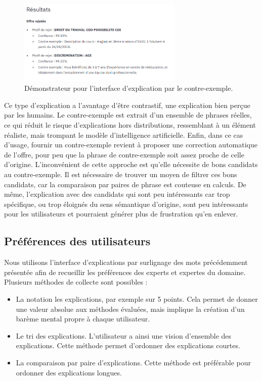 \begin{figure}[htpb!]
\centering
\includegraphics[width=0.7\textwidth]{S2-Explicabilite_locale/figures/demo_cfe.png}
\caption{Démonstrateur pour l'interface d'explication par le contre-exemple.}
\label{fig:demo_cfe}
\end{figure}

Ce type d'explication a l'avantage d'être contrastif, une explication bien perçue par les humains.  %
Le contre-exemple est extrait d'un ensemble de phrases réelles, ce qui réduit le risque d'explications hors distributions, ressemblant à un élément réaliste, mais trompant le modèle d'intelligence artificielle.
Enfin, dans ce cas d'usage, fournir un contre-exemple revient à proposer une correction automatique de l'offre, pour peu que la phrase de contre-exemple soit assez proche de celle d'origine.
L'inconvénient de cette approche est qu'elle nécessite de bons candidats au contre-exemple. Il est nécessaire de trouver un moyen de filtrer ces bons candidats, car la comparaison par paires de phrase est couteuse en calculs. De même, l'explication avec des candidats qui sont peu intéressants car trop spécifique, ou trop éloignés du sens sémantique d'origine, sont peu intéressants pour les utilisateurs et pourraient générer plus de frustration qu'en enlever.

\subsection{Préférences des utilisateurs} \label{C2:collect_pref}

Nous utilisons l'interface d'explications par surlignage des mots précédemment présentée afin de recueillir les préférences des experts et expertes du domaine. Plusieurs méthodes de collecte sont possibles :
\begin{itemize}
    \item La notation les explications, par exemple sur 5 points. Cela permet de donner une valeur absolue aux méthodes évaluées, mais implique la création d'un barème mental propre à chaque utilisateur.
    \item Le tri des explications. L'utilisateur a ainsi une vision d'ensemble des explications. Cette méthode permet d'ordonner des explications courtes.
    \item La comparaison par paire d'explications. Cette méthode est préférable pour ordonner des explications longues.
\end{itemize}

